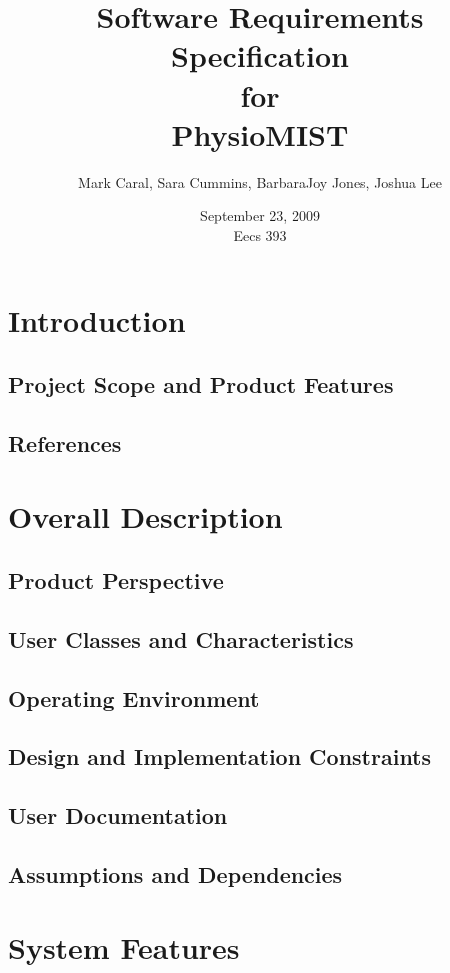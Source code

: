 \documentclass{article}
\title{Software Requirements Specification\\
\bigskip
{\large for}\\
\bigskip
PhysioMIST}
\author{Mark Caral, Sara Cummins, BarbaraJoy Jones, Joshua Lee}
\date{September 23, 2009\\{\sc Eecs} 393}
\begin{document}
\begin{titlepage}
\maketitle
\end{titlepage}

\tableofcontents
\newpage

\section{Introduction}
\subsection{Project Scope and Product Features}
\subsection{References}

\section{Overall Description}
\subsection{Product Perspective}
\subsection{User Classes and Characteristics}
\subsection{Operating Environment}
\subsection{Design and Implementation Constraints}
\subsection{User Documentation}
\subsection{Assumptions and Dependencies}

\section{System Features}
\end{document}
